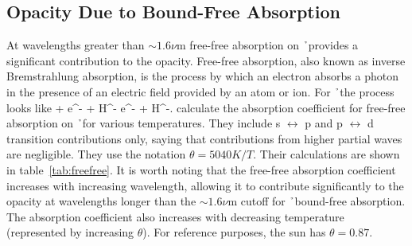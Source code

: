 \subsection{Opacity Due to Bound-Free Absorption}
At wavelengths greater than $\sim1.6\nu$m free-free absorption on \h\ provides a significant contribution to the opacity.  Free-free absorption, also known as inverse Bremstrahlung absorption, is the process by which an electron absorbs a photon in the presence of an electric field provided by an atom or ion.  For \h\ the process looks like
\beq
\gamma + e^- + H^- \rightarrow e^- + H^-.
\eeq
\cite{bell1987} calculate the absorption coefficient for free-free absorption on \h\ for various temperatures.  They include s $\leftrightarrow$ p and p $\leftrightarrow$ d transition contributions only, saying that contributions from higher partial waves are negligible.  They use the notation $\theta=5040 K /T$. Their calculations are shown in table~\ref{tab:freefree}.  It is worth noting that the free-free absorption coefficient increases with increasing wavelength, allowing it to contribute significantly to the opacity at wavelengths longer than the $\sim 1.6\nu$m cutoff for \h\ bound-free absorption.  The absorption coefficient also increases with decreasing temperature (represented by increasing $\theta$).  For reference purposes,  the sun has $\theta=0.87$.
